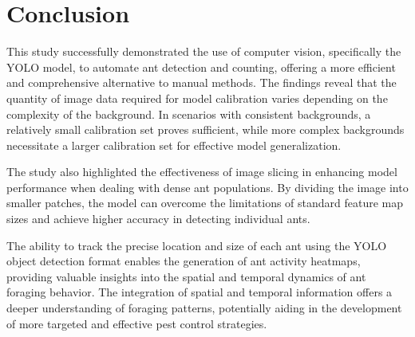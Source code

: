 \section{Conclusion}

This study successfully demonstrated the use of computer vision, specifically the YOLO model, to automate ant detection and counting, offering a more efficient and comprehensive alternative to manual methods. The findings reveal that the quantity of image data required for model calibration varies depending on the complexity of the background. In scenarios with consistent backgrounds, a relatively small calibration set proves sufficient, while more complex backgrounds necessitate a larger calibration set for effective model generalization.

The study also highlighted the effectiveness of image slicing in enhancing model performance when dealing with dense ant populations. By dividing the image into smaller patches, the model can overcome the limitations of standard feature map sizes and achieve higher accuracy in detecting individual ants.

The ability to track the precise location and size of each ant using the YOLO object detection format enables the generation of ant activity heatmaps, providing valuable insights into the spatial and temporal dynamics of ant foraging behavior. The integration of spatial and temporal information offers a deeper understanding of foraging patterns, potentially aiding in the development of more targeted and effective pest control strategies.
